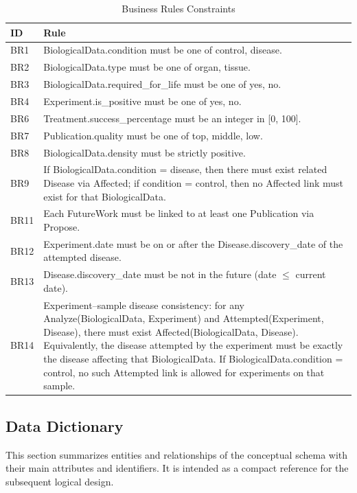 \documentclass[11pt,a4paper]{article}
\begin{document}
\begin{table}[H]
\centering
\renewcommand{\arraystretch}{1.25}
\begin{tabular}{|p{2.2cm}|p{12.5cm}|}
\hline
\textbf{ID} & \textbf{Rule} \\
\hline
BR1 & BiologicalData.condition must be one of {control, disease}. \\
\hline
BR2 & BiologicalData.type must be one of {organ, tissue}. \\
\hline
BR3 & BiologicalData.required\_for\_life must be one of {yes, no}. \\
\hline
BR4 & Experiment.is\_positive must be one of {yes, no}. \\
\hline
BR6 & Treatment.success\_percentage must be an integer in [0, 100]. \\
\hline
BR7 & Publication.quality must be one of {top, middle, low}. \\
\hline
BR8 & BiologicalData.density must be strictly positive. \\
\hline
BR9 & If BiologicalData.condition = disease, then there must exist related Disease via Affected; if condition = control, then no Affected link must exist for that BiologicalData. \\
\hline
BR11 & Each FutureWork must be linked to at least one Publication via Propose. \\
\hline
BR12 & Experiment.date must be on or after the Disease.discovery\_date of the attempted disease. \\
\hline
BR13 & Disease.discovery\_date must be not in the future (date \(\le\) current date). \\
\hline
BR14 & Experiment–sample disease consistency: for any Analyze(BiologicalData, Experiment) and Attempted(Experiment, Disease), there must exist Affected(BiologicalData, Disease). Equivalently, the disease attempted by the experiment must be exactly the disease affecting that BiologicalData. If BiologicalData.condition = control, no such Attempted link is allowed for experiments on that sample. \\
\hline
\end{tabular}
\caption{Business Rules Constraints}
\end{table}


\subsection{Data Dictionary}

This section summarizes entities and relationships of the conceptual schema with their main attributes and identifiers. It is intended as a compact reference for the subsequent logical design.
\end{document}
